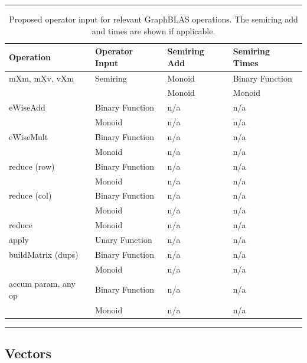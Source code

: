 \begin{table}
    \hrule
    \begin{center}
        \caption{Proposed operator input for relevant GraphBLAS operations. 
        The semiring add and times are shown if applicable.}
        \label{Tab:OperatorInputType}
        \begin{tabular}{l|l|l|l}
        Operation           & Operator Input  & Semiring Add & Semiring Times  \\ \hline
        {\sf mXm, mXv, vXm} & Semiring        & Monoid       & Binary Function \\
                            &                 & Monoid       & Monoid \\
        {\sf eWiseAdd}      & Binary Function & n/a          & n/a  \\
                            & Monoid          & n/a          & n/a  \\
        {\sf eWiseMult}     & Binary Function & n/a          & n/a  \\
                            & Monoid          & n/a          & n/a  \\
        {\sf reduce} (row)  & Binary Function & n/a          & n/a  \\
                            & Monoid          & n/a          & n/a  \\
        {\sf reduce} (col)  & Binary Function & n/a          & n/a  \\
                            & Monoid          & n/a          & n/a  \\
        {\sf reduce}        & Monoid          & n/a          & n/a  \\
        {\sf apply}         & Unary Function  & n/a          & n/a  \\
  {\sf buildMatrix} (dups)  & Binary Function & n/a          & n/a  \\
                            & Monoid          & n/a          & n/a  \\
{\sf accum} param, any op   & Binary Function & n/a          & n/a  \\
                            & Monoid          & n/a          & n/a  \\
        \end{tabular}
    \end{center}
    \hrule
\end{table}

\subsection{Vectors}
\label{Sec:Vectors}

